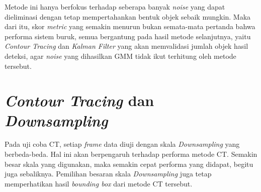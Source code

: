     	Metode ini hanya berfokus terhadap seberapa banyak \textit{noise} yang dapat dieliminasi dengan tetap mempertahankan bentuk objek sebaik mungkin. Maka dari itu, skor \textit{metric} yang semakin menurun bukan semata-mata pertanda bahwa performa sistem buruk, semua bergantung pada hasil metode selanjutnya, yaitu \textit{Contour Tracing} dan \textit{Kalman Filter} yang akan memvalidasi jumlah objek hasil deteksi, agar \textit{noise} yang dihasilkan GMM tidak ikut terhitung oleh metode tersebut.

    \section{\textit{Contour Tracing} dan \textit{Downsampling}}
        Pada uji coba CT, setiap \textit{frame} data diuji dengan skala \textit{Downsampling} yang berbeda-beda. Hal ini akan berpengaruh terhadap performa metode CT. Semakin besar skala yang digunakan, maka semakin cepat performa yang didapat, begitu juga sebaliknya. Pemilihan besaran skala \textit{Downsampling} juga tetap memperhatikan hasil \textit{bounding box} dari metode CT tersebut.
        
